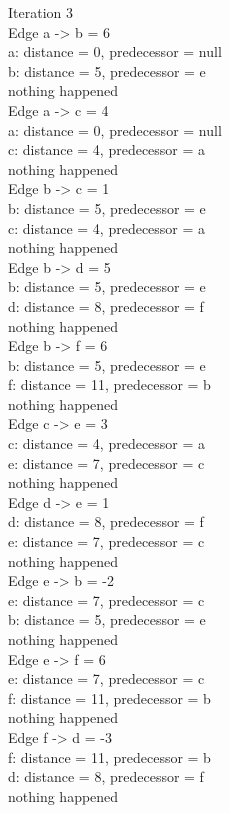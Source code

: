 \noindent Iteration 3\\
Edge a -> b = 6\\
a: distance = 0, predecessor = null\\
b: distance = 5, predecessor = e\\
nothing happened\\
Edge a -> c = 4\\
a: distance = 0, predecessor = null\\
c: distance = 4, predecessor = a\\
nothing happened\\
Edge b -> c = 1\\
b: distance = 5, predecessor = e\\
c: distance = 4, predecessor = a\\
nothing happened\\
Edge b -> d = 5\\
b: distance = 5, predecessor = e\\
d: distance = 8, predecessor = f\\
nothing happened\\
Edge b -> f = 6\\
b: distance = 5, predecessor = e\\
f: distance = 11, predecessor = b\\
nothing happened\\
Edge c -> e = 3\\
c: distance = 4, predecessor = a\\
e: distance = 7, predecessor = c\\
nothing happened\\
Edge d -> e = 1\\
d: distance = 8, predecessor = f\\
e: distance = 7, predecessor = c\\
nothing happened\\
Edge e -> b = -2\\
e: distance = 7, predecessor = c\\
b: distance = 5, predecessor = e\\
nothing happened\\
Edge e -> f = 6\\
e: distance = 7, predecessor = c\\
f: distance = 11, predecessor = b\\
nothing happened\\
Edge f -> d = -3\\
f: distance = 11, predecessor = b\\
d: distance = 8, predecessor = f\\
nothing happened\\

